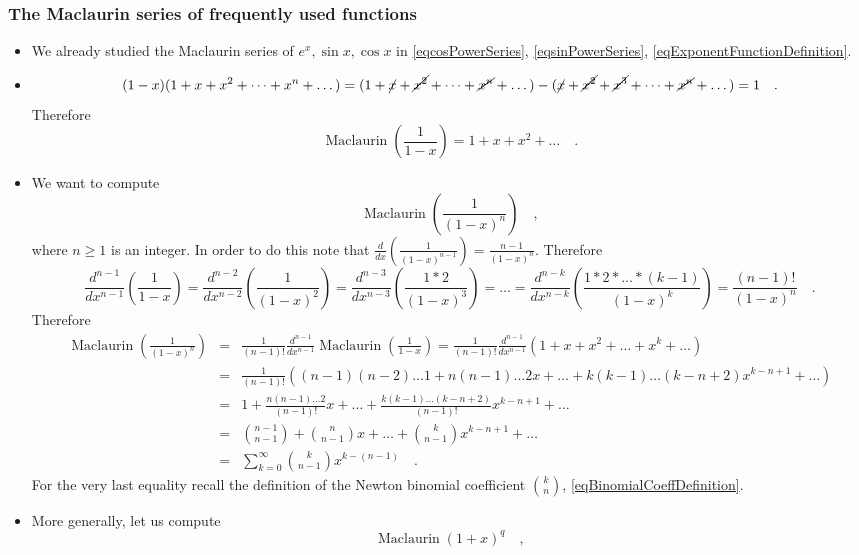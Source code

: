 \documentclass[12pt]{book}
\DeclareMathOperator{\maclaurin}{Maclaurin}
\begin{document}
\subsubsection{The Maclaurin series of frequently used functions}
\begin{itemize}
\item We already studied the Maclaurin series of $e^x, \sin x, \cos x$ in \eqref{eqcosPowerSeries}, \eqref{eqsinPowerSeries}, \eqref{eqExponentFunctionDefinition}.
\item 
\[
(1-x)(1+x+x^2+\dots +x^n+\dots) = (1+\cancel{x}+\cancel{x^2}+\dots +\cancel{x^n} +\dots)- (\cancel{x}+\cancel{x^2}+\cancel{x^3}+\dots + \cancel{x^n}+\dots)= 1\quad . 
\]
Therefore 
\begin{equation}\label{eqInfiniteGeometricProgression}
\maclaurin \left( \frac{1}{1-x}\right)= 1+x+x^2+\dots \quad .
\end{equation}
\item We want to compute
\[
\maclaurin\left(\frac{1}{(1-x)^n}\right)\quad ,
\]
where $n\geq 1$ is an integer. In order to do this note that $\frac{d}{dx}\left(\frac{1}{(1-x)^{n-1}}\right)= \frac{n-1}{(1-x)^{n}} $. Therefore 
\[
\frac{d^{n-1}}{dx^{n-1}} \left(\frac{1}{1-x}\right)= \frac{d^{n-2}}{dx^{n-2}}\left(\frac{1}{(1-x)^2}\right)= \frac{d^{n-3}}{dx^{n-3}}\left(\frac{1*2}{(1-x)^3}\right) = \dots=\frac{d^{n-k}}{dx^{n-k}}\left(\frac{1*2*\dots *(k-1)}{(1-x)^{k}}\right)= \frac{(n-1)!}{(1-x)^n} \quad .
\]
Therefore 
\[\begin{array}{rcl}
\displaystyle \maclaurin\left(\frac{1}{(1-x)^n}\right)&=& \displaystyle \frac{1}{(n-1)!}\frac{d^{n-1}}{dx^{n-1}} \maclaurin \left(\frac{1}{1-x}\right)= 
\frac{1}{(n-1)!}\frac{d^{n-1}}{dx^{n-1}}(1+x+x^2+\dots +x^k+\dots )\\
&=& \displaystyle \frac{1}{(n-1)!}( (n-1)(n-2)\dots 1+n(n-1)\dots 2 x +  \dots + k(k-1)\dots (k-n+2)x^{k-n+1}+\dots )\\
&=& 1+ \frac{n (n-1)\dots 2}{(n-1)!} x + \dots + \frac{ k(k-1)\dots (k-n+2)}{(n-1)!}x^{k-n+1}+\dots \\
&=& \binom{ n-1}{n-1} + \binom{n}{n-1}x+\dots + \binom{k}{n-1}x^{k-n+1}+\dots \\
&=&\displaystyle\sum_{k=0}^\infty \binom {k}{n-1}x^{k-(n-1)}\quad .
\end{array}
\]
For the very last equality recall the definition of the Newton binomial coefficient $\binom{k}{n}$, \eqref{eqBinomialCoeffDefinition}. 
\item More generally, let us compute 
\[
\maclaurin (1+x)^q\quad , 
\]
\end{itemize}
\end{document}
